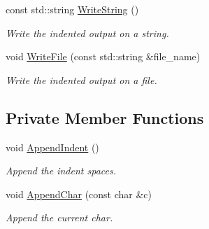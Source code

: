 \begin{DoxyCompactItemize}
const std\+::string \hyperlink{classIndentedOutputStream_a69a252892d688978533206a3cca900bb}{Write\+String} ()
\begin{DoxyCompactList}\small\item\em Write the indented output on a string. \end{DoxyCompactList}\item 
void \hyperlink{classIndentedOutputStream_a7af26dbbc73375326e27675b25824063}{Write\+File} (const std\+::string \&file\+\_\+name)
\begin{DoxyCompactList}\small\item\em Write the indented output on a file. \end{DoxyCompactList}\end{DoxyCompactItemize}
\subsection*{Private Member Functions}
\begin{DoxyCompactItemize}
\item 
void \hyperlink{classIndentedOutputStream_adeb5dd8a59cf3f5b24809212f6cc286d}{Append\+Indent} ()
\begin{DoxyCompactList}\small\item\em Append the indent spaces. \end{DoxyCompactList}\item 
void \hyperlink{classIndentedOutputStream_aae0d3f029caa08e9ce3b8107ded932b3}{Append\+Char} (const char \&c)
\begin{DoxyCompactList}\small\item\em Append the current char. \end{DoxyCompactList}\end{DoxyCompactItemize}
